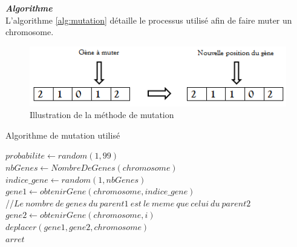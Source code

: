 	\hspace*{.5cm} \textbf{\textsl{Algorithme}}\\
	\hspace*{.5cm} L'algorithme \ref{alg:mutation} détaille le processus utilisé afin de faire muter un chromosome. 
	
	\begin{figure}[!h]
		\begin{center}
			\includegraphics[scale=.5]{images/mutation_fig.png}
			\caption{Illustration de la méthode de mutation}
			\label{fig:used_mutation}
		\end{center}
	\end{figure}
	
	\begin{algorithm}[H]
 		\caption{Algorithme de mutation utilisé}
 		\label{alg:mutation}
 		\BlankLine
 		$probabilite \gets random(1,99)$ \\
 		\BlankLine
 		{
 			\BlankLine
 			$nbGenes \gets NombreDeGenes(chromosome)$\\
 			\BlankLine
 			$indice\_gene \gets random(1, nbGenes)$\\
 			\BlankLine
 			$gene1 \gets obtenirGene(chromosome, indice\_gene)$ \\
 			\BlankLine
 			//$ Le \ nombre \ de \ genes \ du \ parent1 \ est \ le \ meme \ que \ celui \ du \ parent2 $\\
 			\BlankLine
 			{
 				\BlankLine
 				$gene2 \gets obtenirGene(chromosome, i)$\\
 				\BlankLine
 				{
 					\BlankLine
 					$deplacer(gene1, gene2, chromosome)$ \\
 					\BlankLine
 					$arret$
 					\BlankLine
 				}
 			}
 		}
		\end{algorithm}
		
